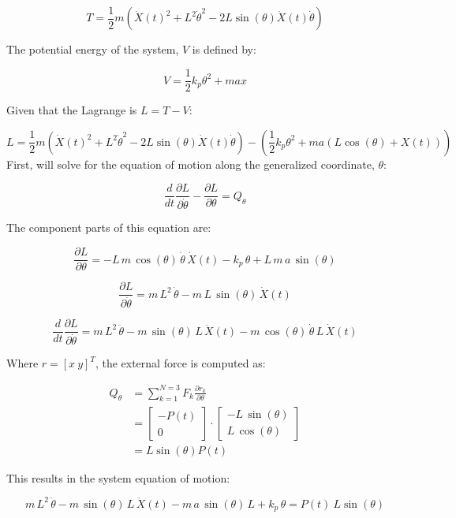 \documentclass[12pt, letterpaper]{../assignment}
\begin{document}
$$ T = \frac{1}{2} m \left(\dot{X}(t)^2 + L^2\dot{\theta}^2 - 2 L \sin(\theta)\dot{X}(t)\dot{\theta}\right)  $$

The potential energy of the system, $V$ is defined by:

$$ V = \frac{1}{2} k_p \theta^2 + m a x $$


Given that the Lagrange is $ L = T - V $:

$$ L = \frac{1}{2} m \left(\dot{X}(t)^2 + L^2\dot{\theta}^2 - 2 L \sin(\theta)\dot{X}(t)\dot{\theta}\right)- \left( \frac{1}{2} k_p \theta^2 + m a \left(L\cos(\theta)+X(t)\right) \right)$$
First, will solve for the equation of motion along the generalized coordinate, $\theta$:

$$ \frac{d}{d t} \frac{\partial L}{\partial \dot{\theta}} - \frac{\partial L}{\partial \theta} = Q_\theta $$

The component parts of this equation are:

$$ \frac{\partial L}{\partial \theta} = 
-L\,m\,\cos\left(\theta\right)\,\dot{\theta}\,\dot{X}(t)-k_{p}\,\theta+L\,m\,a\,\sin\left(\theta\right)  $$

$$ \frac{\partial L}{\partial \dot{\theta}}  =
m\,L^2\,\dot{\theta}-m\,L\,\sin\left(\theta\right)\,\dot{X}(t)$$

$$ \frac{d}{d t} \frac{\partial L}{\partial \dot{\theta}} =
m\,L^2\,\ddot{\theta}-m\,\sin\left(\theta\right)\,L\,\ddot{X}(t)-m\,\cos\left(\theta\right)\,\dot{\theta}\,L\,\dot{X}(t) $$

Where $r = [x \ y]^T$, the external force is computed as:

\begin{equation*}
\begin{aligned}
Q_\theta &= \sum_{k=1}^{N=3} F_k \frac{\partial r_k }{\partial \theta}\\
&=\left[\begin{array}{c} -P\left(t\right)\\ 0 \end{array}\right] \cdot \left[\begin{array}{c} -L\,\sin\left(\theta\right)\\ L\,\cos\left(\theta\right) \end{array}\right]\\
&= L\sin(\theta) P(t)
\end{aligned}
\end{equation*}

This results in the system equation of motion:

$$ m\,L^2\,\ddot{\theta}-m\,\sin\left(\theta\right)\,L\,\ddot{X}(t)-m\,a\,\sin\left(\theta\right)\,L+k_{p}\,\theta =  P(t)\ L \sin(\theta)   $$
\end{document}

